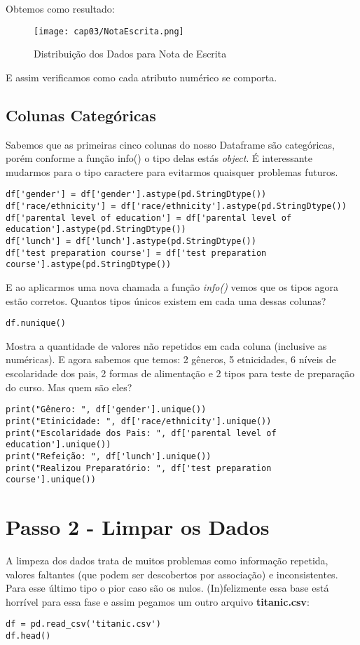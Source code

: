 Obtemos como resultado:
\begin{figure}[H]
	\centering
	\texttt{[image: cap03/NotaEscrita.png]}
	\caption{Distribuição dos Dados para Nota de Escrita}
\end{figure}

E assim verificamos como cada atributo numérico se comporta.

\subsection{Colunas Categóricas}
Sabemos que as primeiras cinco colunas do nosso Dataframe são categóricas, porém conforme a função info() o tipo delas estás \textit{object}. É interessante mudarmos para o tipo caractere para evitarmos quaisquer problemas futuros.
\begin{lstlisting}
df['gender'] = df['gender'].astype(pd.StringDtype())
df['race/ethnicity'] = df['race/ethnicity'].astype(pd.StringDtype())
df['parental level of education'] = df['parental level of education'].astype(pd.StringDtype())
df['lunch'] = df['lunch'].astype(pd.StringDtype())
df['test preparation course'] = df['test preparation course'].astype(pd.StringDtype())
\end{lstlisting}

E ao aplicarmos uma nova chamada a função \textit{info()} vemos que os tipos agora estão corretos. Quantos tipos únicos existem em cada uma dessas colunas?
\begin{lstlisting}
df.nunique()
\end{lstlisting}

Mostra a quantidade de valores não repetidos em cada coluna (inclusive as numéricas). E agora sabemos que temos: 2 gêneros, 5 etnicidades, 6 níveis de escolaridade dos pais, 2 formas de alimentação e 2 tipos para teste de preparação do curso. Mas quem são eles?
\begin{lstlisting}
print("Gênero: ", df['gender'].unique())
print("Etinicidade: ", df['race/ethnicity'].unique())
print("Escolaridade dos Pais: ", df['parental level of education'].unique())
print("Refeição: ", df['lunch'].unique())
print("Realizou Preparatório: ", df['test preparation course'].unique())
\end{lstlisting}

\section{Passo 2 - Limpar os Dados}
A limpeza dos dados trata de muitos problemas como informação repetida, valores faltantes (que podem ser descobertos por associação) e inconsistentes. Para esse último tipo o pior caso são os nulos. (In)felizmente essa base está horrível para essa fase e assim pegamos um outro arquivo \textbf{titanic.csv}: 
\begin{lstlisting}
df = pd.read_csv('titanic.csv')
df.head()
\end{lstlisting}

